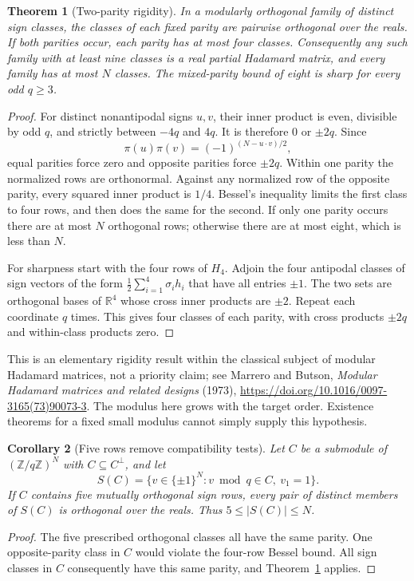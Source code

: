 \documentclass[11pt]{article}
\newtheorem{theorem}{Theorem}[section]
\newtheorem{corollary}[theorem]{Corollary}
\begin{document}
\begin{theorem}[Two-parity rigidity]\label{code:parity}
In a modularly orthogonal family of distinct sign classes, the
classes of each fixed parity are pairwise orthogonal over the reals.
If both parities occur, each parity has at most four classes.
Consequently any such family with at least nine classes is a real
partial Hadamard matrix, and every family has at most $N$ classes.
The mixed-parity bound of eight is sharp for every odd $q\ge3$.
\end{theorem}
\begin{proof}
For distinct nonantipodal signs $u,v$, their inner product is even,
divisible by odd $q$, and strictly between $-4q$ and $4q$. It is
therefore $0$ or $\pm2q$. Since
\[
 \pi(u)\pi(v)=(-1)^{(N-u\cdot v)/2},
\]
equal parities force zero and opposite parities force $\pm2q$.
Within one parity the normalized rows are orthonormal. Against
any normalized row of the opposite parity, every squared inner
product is $1/4$. Bessel's inequality limits the first class to
four rows, and then does the same for the second.
If only one parity occurs there are at most $N$ orthogonal rows;
otherwise there are at most eight, which is less than $N$.

For sharpness start with the four rows of $H_4$. Adjoin the four
antipodal classes of sign vectors of the form
$\frac12\sum_{i=1}^4\sigma_i h_i$ that have all entries $\pm1$.
The two sets are orthogonal bases of $\mathbb R^4$ whose cross
inner products are $\pm2$. Repeat each coordinate $q$ times.
This gives four classes of each parity, with cross products
$\pm2q$ and within-class products zero.
\end{proof}

This is an elementary rigidity result within the classical subject
of modular Hadamard matrices, not a priority claim; see Marrero and
Butson, \emph{Modular Hadamard matrices and related designs} (1973),
\url{https://doi.org/10.1016/0097-3165(73)90073-3}.
The modulus here grows with the target order. Existence theorems
for a fixed small modulus cannot simply supply this hypothesis.

\begin{corollary}[Five rows remove compatibility tests]\label{code:five}
Let $C$ be a submodule of $(\mathbb Z/q\mathbb Z)^N$ with
$C\subseteq C^\perp$, and let
\[
 S(C)=\{v\in\{\pm1\}^N:v\bmod q\in C,\ v_1=1\}.
\]
If $C$ contains five mutually orthogonal sign rows, every pair of
distinct members of $S(C)$ is orthogonal over the reals.
Thus $5\le |S(C)|\le N$.
\end{corollary}
\begin{proof}
The five prescribed orthogonal classes all have the same parity.
One opposite-parity class in $C$ would violate the four-row Bessel
bound. All sign classes in $C$ consequently have this same parity,
and Theorem~\ref{code:parity} applies.
\end{proof}
\end{document}
